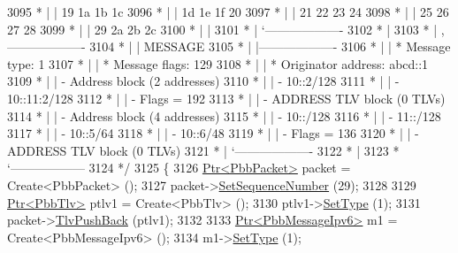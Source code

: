 \begin{DoxyCode}
3095 \textcolor{comment}{         * |    |                           19  1a  1b  1c}
3096 \textcolor{comment}{         * |    |                           1d  1e  1f  20}
3097 \textcolor{comment}{         * |    |                           21  22  23  24}
3098 \textcolor{comment}{         * |    |                           25  26  27  28}
3099 \textcolor{comment}{         * |    |                           29  2a  2b  2c}
3100 \textcolor{comment}{         * |    |}
3101 \textcolor{comment}{         * |    `-------------------}
3102 \textcolor{comment}{         * |}
3103 \textcolor{comment}{         * |    ,-------------------}
3104 \textcolor{comment}{         * |    |  MESSAGE}
3105 \textcolor{comment}{         * |    |-------------------}
3106 \textcolor{comment}{         * |    | * Message type:       1}
3107 \textcolor{comment}{         * |    | * Message flags:  129}
3108 \textcolor{comment}{         * |    | * Originator address: abcd::1}
3109 \textcolor{comment}{         * |    | - Address block (2 addresses)}
3110 \textcolor{comment}{         * |    |     - 10::2/128}
3111 \textcolor{comment}{         * |    |     - 10::11:2/128}
3112 \textcolor{comment}{         * |    |     - Flags = 192}
3113 \textcolor{comment}{         * |    | - ADDRESS TLV block (0 TLVs)}
3114 \textcolor{comment}{         * |    | - Address block (4 addresses)}
3115 \textcolor{comment}{         * |    |     - 10::/128}
3116 \textcolor{comment}{         * |    |     - 11::/128}
3117 \textcolor{comment}{         * |    |     - 10::5/64}
3118 \textcolor{comment}{         * |    |     - 10::6/48}
3119 \textcolor{comment}{         * |    |     - Flags = 136}
3120 \textcolor{comment}{         * |    | - ADDRESS TLV block (0 TLVs)}
3121 \textcolor{comment}{         * |    `-------------------}
3122 \textcolor{comment}{         * |}
3123 \textcolor{comment}{         * `------------------}
3124 \textcolor{comment}{   */}
3125   \{
3126     \hyperlink{classns3_1_1Ptr}{Ptr<PbbPacket>} packet = Create<PbbPacket> ();
3127     packet->\hyperlink{classns3_1_1PbbPacket_a7d6a1602be86109760d0f26ff9bbbb8e}{SetSequenceNumber} (29);
3128 
3129     \hyperlink{classns3_1_1Ptr}{Ptr<PbbTlv>} ptlv1 = Create<PbbTlv> ();
3130     ptlv1->\hyperlink{classns3_1_1PbbTlv_a90a0452018ed364ac37c3ad116dd718b}{SetType} (1);
3131     packet->\hyperlink{classns3_1_1PbbPacket_a34935793e729a106c176db99c969cb42}{TlvPushBack} (ptlv1);
3132 
3133     \hyperlink{classns3_1_1Ptr}{Ptr<PbbMessageIpv6>} m1 = Create<PbbMessageIpv6> ();
3134     m1->\hyperlink{classns3_1_1PbbMessage_a4b3d1eaabd3e7412a46ac79bf3360dac}{SetType} (1);

\end{DoxyCode}
